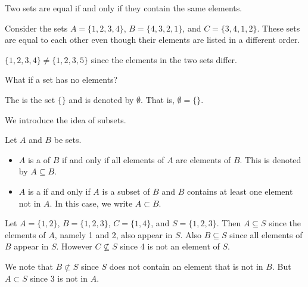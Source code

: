 \begin{definition}
    Two sets are equal if and only if they contain the same elements.
\end{definition}

\begin{example}
    Consider the sets $A = \{1, 2, 3, 4\}$, $B = \{4, 3, 2, 1\}$, and $C = \{3, 4, 1, 2\}$. These sets are equal to each other even though their elements are listed in a different order.
\end{example}

\begin{example}
    $\{1, 2, 3, 4\} \neq \{1, 2, 3, 5\}$ since the elements in the two sets differ.
\end{example}

What if a set has no elements?
\begin{definition}
    The  is the set $\{\}$ and is denoted by $\emptyset$. That is, $\emptyset = \{\}$.
\end{definition}

We introduce the idea of subsets.
\begin{definition}
    Let $A$ and $B$ be sets.
    \begin{itemize}
        \item $A$ is a  of $B$ if and only if all elements of $A$ are elements of $B$. This is denoted by $A \subseteq B$.
        \item $A$ is a  if and only if $A$ is a subset of $B$ and $B$ contains at least one element not in $A$. In this case, we write $A \subset B$.
    \end{itemize}
\end{definition}

\begin{example}
    Let $A = \{1, 2\}$, $B = \{1, 2, 3\}$, $C = \{1, 4\}$, and $S = \{1, 2, 3\}$. Then $A \subseteq S$ since the elements of $A$, namely 1 and 2, also appear in $S$. Also $B \subseteq S$ since all elements of $B$ appear in $S$. However $C \not\subseteq S$ since 4 is not an element of $S$.

    We note that $B \not\subset S$ since $S$ does not contain an element that is not in $B$. But $A \subset S$ since 3 is not in $A$.
\end{example}

